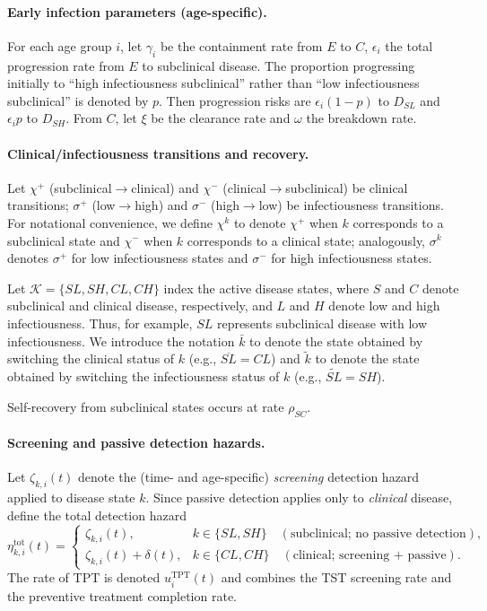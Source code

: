 \documentclass[11pt]{article}
\begin{document}
\paragraph{Early infection parameters (age-specific).}
For each age group \(i\), let \(\gamma_i\) be the containment rate from \(E\) to \(C\), \(\epsilon_i\) the total progression rate from \(E\) to subclinical disease. The proportion progressing initially to ``high infectiousness subclinical'' rather than ``low infectiousness subclinical'' is denoted by \(p\). Then progression risks are \(\epsilon_i(1-p)\) to \(D_{SL}\) and \(\epsilon_i p\) to \(D_{SH}\). From \(C\), let \(\xi\) be the clearance rate and \(\omega\) the breakdown rate.

\paragraph{Clinical/infectiousness transitions and recovery.}
Let \(\chi^+\) (subclinical\(\to\)clinical) and \(\chi^-\) (clinical\(\to\)subclinical) be clinical transitions; \(\sigma^+\) (low\(\to\)high) and \(\sigma^-\) (high\(\to\)low) be infectiousness transitions. 
For notational convenience, we define \(\chi^k\) to denote \(\chi^+\) when \(k\) corresponds to a subclinical state and \(\chi^-\) when \(k\) corresponds to a clinical state; analogously, \(\sigma^k\) denotes \(\sigma^+\) for low infectiousness states and \(\sigma^-\) for high infectiousness states.

Let \(\mathcal{K}=\{SL,SH,CL,CH\}\) index the active disease states, where \(S\) and \(C\) denote subclinical and clinical disease, respectively, and
\(L\) and \(H\) denote low and high infectiousness. Thus, for example, \(SL\) represents subclinical disease with low infectiousness.
We introduce the notation \(\bar{k}\) to denote the state obtained by switching the clinical status of \(k\) (e.g., \(\overline{SL} = CL\)) 
and \(\tilde{k}\) to denote the state obtained by switching the infectiousness status of \(k\) (e.g., \(\tilde{SL} = SH\)).

Self-recovery from subclinical states occurs at rate \(\rho_{SC}\).

\paragraph{Screening and passive detection hazards.}
Let \(\zeta_{k,i}(t)\) denote the (time- and age-specific) \emph{screening} detection hazard applied to disease state \(k\). Since passive detection applies only to \emph{clinical} disease, define the total detection hazard
\[
\eta_{k,i}^{\text{tot}}(t) =
\begin{cases}
\zeta_{k,i}(t), & k\in\{SL,SH\}\quad(\text{subclinical; no passive detection}),\\[4pt]
\zeta_{k,i}(t) + \delta(t), & k\in\{CL,CH\}\quad(\text{clinical; screening + passive}).
\end{cases}
\]
The rate of TPT is denoted \(u^{\mathrm{TPT}}_i(t)\) and combines the TST screening rate and the preventive treatment completion rate.
\end{document}
